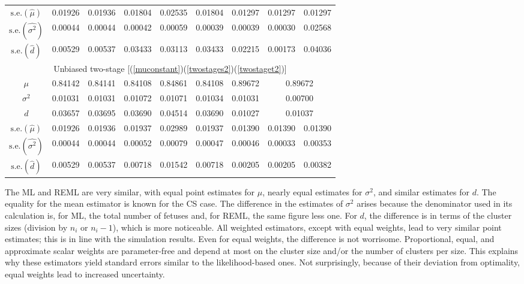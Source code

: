 \documentclass[11pt,a5paper,twoside]{book}
\begin{document}
\begin{table}[!t]
\begin{center}
{\begin{tabular}{ccccccccc}
\hline
$\mbox{s.e.}(\widehat{\mu})$ & 0.01926 & 0.01936 & 0.01804 & 0.02535 & 0.01804 & 0.01297 & 0.01297 & 0.01297 \\
$\mbox{s.e.}(\widehat{\sigma^2})$ & 0.00044 & 0.00044 & 0.00042 & 0.00059 & 0.00039 & 0.00039 & 0.00030 & 0.02568 \\
  $\mbox{s.e.}(\widehat{d})$ & 0.00529 & 0.00537 & 0.03433 & 0.03113 & 0.03433 & 0.02215 & 0.00173 & 0.04036 \\
\hline\hline
\multicolumn{9}{c}{{Unbiased two-stage [(\ref{muconstant})(\ref{twostages2})(\ref{twostaget2})]}}\\
\hline
$\mu$ & 0.84142 & 0.84141 & 0.84108 & 0.84861 & 0.84108 & 0.89672 & \multicolumn{2}{c}{0.89672}  \\
  $\sigma^2$ & 0.01031 & 0.01031 & 0.01072 & 0.01071 & 0.01034 & 0.01031 & \multicolumn{2}{c}{0.00700}  \\
$d$  & 0.03657 & 0.03695 & 0.03690 & 0.04514 & 0.03690 & 0.01027 & \multicolumn{2}{c}{0.01037}  \\

\hline
$\mbox{s.e.}(\widehat{\mu})$ & 0.01926 & 0.01936 & 0.01937 & 0.02989 & 0.01937 & 0.01390 & 0.01390 & 0.01390 \\
$\mbox{s.e.}(\widehat{\sigma^2})$ & 0.00044 & 0.00044 & 0.00052 & 0.00079 & 0.00047 & 0.00046 & 0.00033 & 0.00353 \\
  $\mbox{s.e.}(\widehat{d})$ & 0.00529 & 0.00537 & 0.00718 & 0.01542 & 0.00718 & 0.00205 & 0.00205 & 0.00382 \\

\hline\hline
\end{tabular}}
\end{center}
\end{table}


The ML and REML are very similar, with equal point estimates for $\mu$, 
nearly equal estimates for $\sigma^2$, and similar estimates for $d$. 
The equality for the mean estimator is known for the CS case. 
The difference in the estimates of $\sigma^2$ arises because 
the denominator used in its calculation is, for ML, the total number of 
fetuses and, for REML, the same figure less one.
For $d$, the difference is in terms of the cluster sizes 
(division by $n_i$ or $n_i-1$), which is more noticeable. 
All weighted estimators, except with equal weights, 
lead to very similar point estimates; this is in line with the 
simulation results. Even for equal weights, the difference 
is not worrisome. Proportional, equal, and approximate scalar 
weights are parameter-free and depend at most on the cluster 
size and/or the number of clusters per size. This explains 
why these estimators yield standard errors similar to the 
likelihood-based ones. Not surprisingly, because of their 
deviation from optimality, equal weights lead to increased 
uncertainty.
\end{document}
